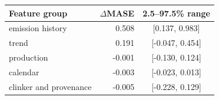 \begin{tabular}{@{}lrc@{}}
\toprule
Feature group & $\Delta$MASE & 2.5--97.5\% range \\
\midrule
emission history & 0.508 & [0.137, 0.983] \\
trend & 0.191 & [-0.047, 0.454] \\
production & -0.001 & [-0.130, 0.124] \\
calendar & -0.003 & [-0.023, 0.013] \\
clinker and provenance & -0.005 & [-0.228, 0.129] \\
\bottomrule
\end{tabular}
